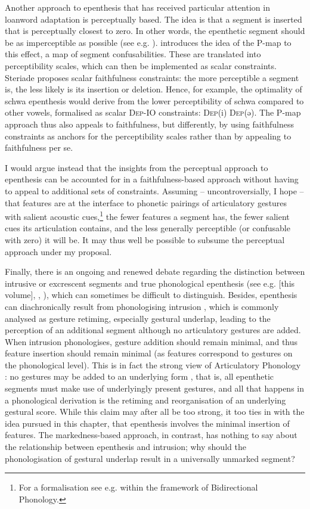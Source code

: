 \documentclass[output=paper,colorlinks,citecolor=brown]{langscibook}
\begin{document}
Another approach to epenthesis that has received particular attention in loanword adaptation is perceptually based. The idea is that a segment is inserted that is perceptually closest to zero. In other words, the epenthetic segment should be as imperceptible as possible (see e.g. \citealt{kenstowicz07}). \citet{Steriade:2009} introduces the idea of the P-map to this effect, a map of segment confusabilities. These are translated into perceptibility scales, which can then be implemented as scalar constraints. Steriade proposes scalar faithfulness constraints: the more perceptible a segment is, the less likely is its insertion or deletion. Hence, for example, the optimality of schwa epenthesis would derive from the lower perceptibility of schwa compared to other vowels, formalised as scalar \textsc{Dep}-IO constraints: \textsc{Dep}(i) \frqq{} \textsc{Dep}(ə). The P-map approach thus also appeals to faithfulness, but differently, by using faithfulness constraints as anchors for the perceptibility scales rather than by appealing to faithfulness per se.

I would argue instead that the insights from the perceptual approach to epenthesis can be accounted for in a faithfulness-based approach without having to appeal to additional sets of constraints. Assuming -- uncontroversially, I hope -- that features are at the interface to phonetic pairings of articulatory gestures with salient acoustic cues,\footnote{For a formalisation see e.g. \citet{boersha09} within the framework of Bidirectional Phonology.} the fewer features a segment has, the fewer salient cues its articulation contains, and the less generally perceptible (or confusable with zero) it will be. It may thus well be possible to subsume the perceptual approach under my proposal.

Finally, there is an ongoing and renewed debate regarding the distinction between intrusive or excrescent segments and true phonological epenthesis (see e.g. \citealt{Hall2006, chapters/08.Hall} [this volume], , ), which can sometimes be difficult to distinguish. Besides, epenthesis can diachronically result from phonologising intrusion \citep{Hall2006, karlin21}, which is commonly analysed as gesture retiming, especially gestural underlap, leading to the perception of an additional segment although no articulatory gestures are added. When intrusion phonologises, gesture addition should remain minimal, and thus feature insertion should remain minimal (as features correspond to gestures on the phonological level). This is in fact the strong view of Articulatory Phonology \citep{browman1992articulatory}: no gestures may be added to an underlying form \citep{gickphono}, that is, all epenthetic segments must make use of underlyingly present gestures, and all that happens in a phonological derivation is the retiming and reorganisation of an underlying gestural score. While this claim may after all be too strong, it too ties in with the idea pursued in this chapter, that epenthesis involves the minimal insertion of features.  The markedness-based approach, in contrast, has nothing to say about the relationship between epenthesis and intrusion; why should the phonologisation of gestural underlap result in a universally unmarked segment? 
\end{document}
